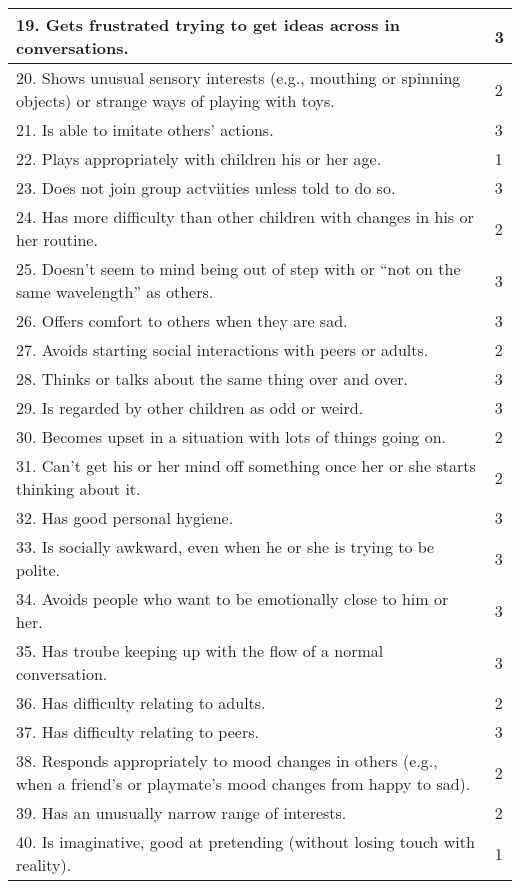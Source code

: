 \begin{appendices}
\begin{longtable}{ | p{13cm} | l | }
	19. Gets frustrated trying to get ideas across in conversations.	&	3	\\	\hline
	20. Shows unusual sensory interests (e.g., mouthing or spinning objects) or strange ways of playing with toys.	&	2	\\	\hline
	21. Is able to imitate others' actions.	&	3	\\	\hline
	22. Plays appropriately with children his or her age.	&	1	\\	\hline
	23. Does not join group actviities unless told to do so.	&	3	\\	\hline
	24. Has more difficulty than other children with changes in his or her routine.	&	2	\\	\hline
	25. Doesn't seem to mind being out of step with or ``not on the same wavelength'' as others.	&	3	\\	\hline
	26. Offers comfort to others when they are sad.	&	3	\\	\hline
	27. Avoids starting social interactions with peers or adults.	&	2	\\	\hline
	28. Thinks or talks about the same thing over and over.	&	3	\\	\hline
	29. Is regarded by other children as odd or weird.	&	3	\\	\hline
	30. Becomes upset in a situation with lots of things going on.	&	2	\\	\hline
	31. Can't get his or her mind off something once her or she starts thinking about it.	&	2	\\	\hline
	32. Has good personal hygiene.	&	3	\\	\hline
	33. Is socially awkward, even when he or she is trying to be polite.	&	3	\\	\hline
	34. Avoids people who want to be emotionally close to him or her.	&	3	\\	\hline
	35. Has troube keeping up with the flow of a normal conversation.	&	3	\\	\hline
	36. Has difficulty relating to adults.	&	2	\\	\hline
	37. Has difficulty relating to peers.	&	3	\\	\hline
	38. Responds appropriately to mood changes in others (e.g., when a friend's or playmate's mood changes from happy to sad).	&	2	\\	\hline
	39. Has an unusually narrow range of interests.	&	2	\\	\hline
	40. Is imaginative, good at pretending (without losing touch with reality).	&	1	\\	\hline

\end{longtable}
\end{appendices}
